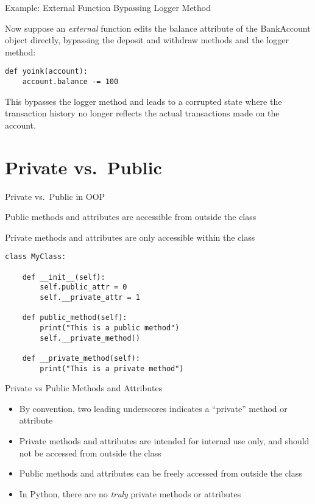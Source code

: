 \documentclass[handout]{beamer}
\begin{document}
\begin{frame}[fragile]{Example: External Function Bypassing Logger Method}
    
    Now suppose an \textit{external} function edits the balance attribute of the BankAccount object directly, bypassing the deposit and withdraw methods and the logger method:
    
    \begin{lstlisting}[style=python]
def yoink(account):
    account.balance -= 100
    \end{lstlisting}
    
    This bypasses the logger method and leads to a corrupted state where the transaction history no longer reflects the actual transactions made on the account.
    
\end{frame}


\section{Private vs.\ Public}

\begin{frame}[fragile]{Private vs.\ Public in OOP}
    
    Public methods and attributes are accessible from outside the class
    
    Private methods and attributes are only accessible within the class
    
    \begin{lstlisting}[style=python]
class MyClass:
    
    def __init__(self):
        self.public_attr = 0
        self.__private_attr = 1
    
    def public_method(self):
        print("This is a public method")
        self.__private_method()
    
    def __private_method(self):
        print("This is a private method")

    \end{lstlisting}
    
\end{frame}


\begin{frame}[fragile]{Private vs Public Methods and Attributes}
  \begin{itemize}
    \item By convention, two leading underscores indicates a ``private'' method or attribute
    \item Private methods and attributes are intended for internal use only, and should not be accessed from outside the class
    \item Public methods and attributes can be freely accessed from outside the class
    \item In Python, there are no \textit{truly} private methods or attributes
  \end{itemize}
\end{frame}
\end{document}
